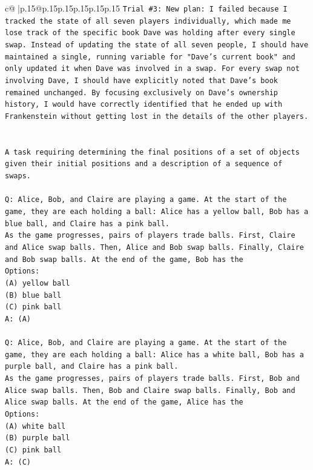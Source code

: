 \documentclass{article}
\begin{document}
{\begin{supertabular}{c@{$\;$}|p{.15\linewidth}@{}p{.15\linewidth}p{.15\linewidth}p{.15\linewidth}p{.15\linewidth}p{.15\linewidth}}
{{{\texttt{Trial \#3: New plan: I failed because I tracked the state of all seven players individually, which made me lose track of the specific book Dave was holding after every single swap. Instead of updating the state of all seven people, I should have maintained a single, running variable for "Dave's current book" and only updated it when Dave was involved in a swap. For every swap not involving Dave, I should have explicitly noted that Dave's book remained unchanged. By focusing exclusively on Dave's ownership history, I would have correctly identified that he ended up with Frankenstein without getting lost in the details of the other players.} \\
\\ 
\\ 
\texttt{A task requiring determining the final positions of a set of objects given their initial positions and a description of a sequence of swaps.} \\
\\ 
\texttt{Q: Alice, Bob, and Claire are playing a game. At the start of the game, they are each holding a ball: Alice has a yellow ball, Bob has a blue ball, and Claire has a pink ball.} \\
\texttt{As the game progresses, pairs of players trade balls. First, Claire and Alice swap balls. Then, Alice and Bob swap balls. Finally, Claire and Bob swap balls. At the end of the game, Bob has the} \\
\texttt{Options:} \\
\texttt{(A) yellow ball} \\
\texttt{(B) blue ball} \\
\texttt{(C) pink ball} \\
\texttt{A: (A)} \\
\\ 
\texttt{Q: Alice, Bob, and Claire are playing a game. At the start of the game, they are each holding a ball: Alice has a white ball, Bob has a purple ball, and Claire has a pink ball.} \\
\texttt{As the game progresses, pairs of players trade balls. First, Bob and Alice swap balls. Then, Bob and Claire swap balls. Finally, Bob and Alice swap balls. At the end of the game, Alice has the} \\
\texttt{Options:} \\
\texttt{(A) white ball} \\
\texttt{(B) purple ball} \\
\texttt{(C) pink ball} \\
\texttt{A: (C)} \\
}}}
\end{supertabular}}
\end{document}
